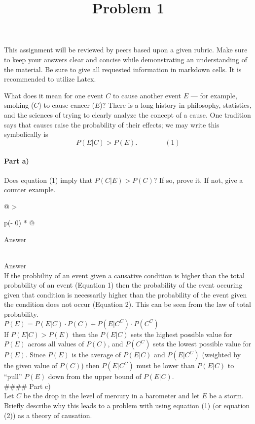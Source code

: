 \documentclass[
  letterpaper,
  DIV=11,
  numbers=noendperiod]{scrartcl}
\title{Problem 1}
\author{}
\date{}
\let\oldparagraph\paragraph
\renewcommand{\paragraph}[1]{\oldparagraph{#1}\mbox{}}
\begin{document}
\maketitle
This assignment will be reviewed by peers based upon a given rubric.
Make sure to keep your answers clear and concise while demonstrating an
understanding of the material. Be sure to give all requested information
in markdown cells. It is recommended to utilize Latex.

What does it mean for one event \(C\) to cause another event \(E\) ---
for example, smoking (\(C\)) to cause cancer (\(E\))? There is a long
history in philosophy, statistics, and the sciences of trying to clearly
analyze the concept of a cause. One tradition says that causes raise the
probability of their effects; we may write this symbolically is \[
P(E | C)>P(E). 
\qquad \qquad (1)
\]

\paragraph{Part a)}\label{part-a}

Does equation (1) imply that \(P(C | E) > P(C)\)? If so, prove it. If
not, give a counter example.

\begin{longtable}[]{@{}
  >{\raggedright\arraybackslash}p{(\columnwidth - 0\tabcolsep) * }@{}}
\toprule\noalign{}
\begin{minipage}[b]{\linewidth}\raggedright
Answer
\end{minipage} \\
\midrule\noalign{}
\endhead
\bottomrule\noalign{}
\endlastfoot
Answer \\
If the probbility of an event given a causative condition is higher than
the total probability of an event (Equation 1) then the probability of
the event occuring given that condition is necessarily higher than the
probability of the event given the condition does not occur (Equation
2). This can be seen from the law of total probability. \\
\(P(E)=P(E|C)\cdot P(C)+P(E|C^C)\cdot P(C^C)\) \\
If \(P(E|C) > P(E)\) then the \(P(E|C)\) sets the highest possible value
for \(P(E)\) across all values of \(P(C)\), and \(P(C^C)\) sets the
lowest possible value for \(P(E)\). Since \(P(E)\) is the average of
\(P(E|C)\) and \(P(E|C^C)\) (weighted by the given value of \(P(C)\))
then \(P(E|C^C)\) must be lower than \(P(E|C)\) to ``pull'' \(P(E)\)
down from the upper bound of \(P(E|C)\). \\
\#\#\#\# Part c) \\
Let \(C\) be the drop in the level of mercury in a barometer and let
\(E\) be a storm. Briefly describe why this leads to a problem with
using equation (1) (or equation (2)) as a theory of causation. \\
\end{longtable}
\end{document}

